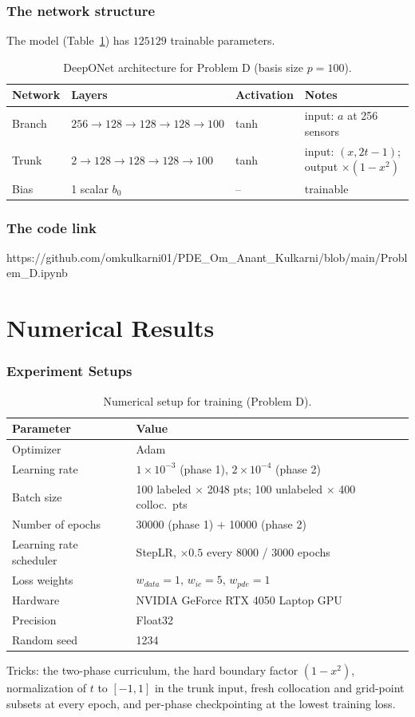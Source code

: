 \subsubsection{The network structure}
The model (Table~\ref{tab:problem_D_net}) has $125129$ trainable
parameters.
%
\begin{table}[htbp]
\centering
\caption{DeepONet architecture for Problem D (basis size $p = 100$).}
\label{tab:problem_D_net}
\begin{tabular}{llll}
\hline
\textbf{Network} & \textbf{Layers} & \textbf{Activation} & \textbf{Notes} \\
\hline
Branch  & $256 \to 128 \to 128 \to 128 \to 100$ & tanh & input: $a$ at 256 sensors \\
Trunk   & $2 \to 128 \to 128 \to 128 \to 100$   & tanh & input: $(x, 2t{-}1)$; output $\times (1-x^2)$ \\
Bias    & 1 scalar $b_0$                        & --   & trainable \\
\hline
\end{tabular}
\end{table}
%
\subsubsection{The code link}
{https://github.com/omkulkarni01/PDE_Om_Anant_Kulkarni/blob/main/Problem_D.ipynb}
%
\section{Numerical Results}
%
\subsubsection{Experiment Setups}
%
\begin{table}[htbp]
\centering
\caption{Numerical setup for training (Problem D).}
\label{tab:problem_D_setup}
\begin{tabular}{ll}
\hline
\textbf{Parameter} & \textbf{Value} \\
\hline
Optimizer                  & Adam \\
Learning rate              & $1\times10^{-3}$ (phase 1), $2\times10^{-4}$ (phase 2) \\
Batch size                 & 100 labeled $\times$ 2048 pts; 100 unlabeled $\times$ 400 colloc.\ pts \\
Number of epochs           & 30000 (phase 1) $+$ 10000 (phase 2) \\
Learning rate scheduler    & StepLR, $\times 0.5$ every 8000 / 3000 epochs \\
Loss weights               & $w_{data}=1$, $w_{ic}=5$, $w_{pde}=1$ \\
Hardware                   & NVIDIA GeForce RTX 4050 Laptop GPU \\
Precision                  & Float32 \\
Random seed                & 1234 \\
\hline
\end{tabular}
\end{table}
%
Tricks: the two-phase curriculum, the hard boundary factor $(1-x^2)$,
normalization of $t$ to $[-1,1]$ in the trunk input, fresh collocation and
grid-point subsets at every epoch, and per-phase checkpointing at the
lowest training loss.
%
